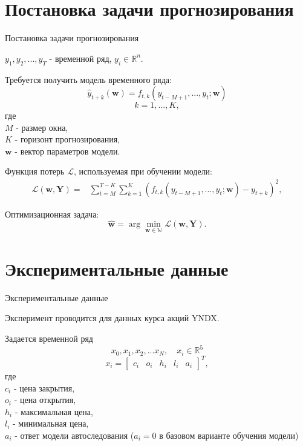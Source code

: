 \documentclass[10pt,pdf,hyperref={unicode}]{beamer}
\begin{document}

\section{Постановка задачи прогнозирования}
\begin{frame}{Постановка задачи прогнозирования}

$y_{1}, y_{2}, ..., y_{T} $ - временной ряд, $y_{i} \in \mathbb{R}^{n}$.

\bigskip

Требуется получить модель временного ряда:
$$\hat{y}_{t+k}(\mathbf{w}) = f_{t,k}(y_{t-M+1}, ..., y_{t}; \mathbf{w})$$
$$k = 1, ..., K,$$
где  \\
$M$ - размер окна, \\
$K$ - горизонт прогнозирования, \\
$\mathbf{w}$ - вектор параметров модели.

Функция потерь $\mathcal{L}$, используемая при обучении модели:
\[
\begin{aligned}
    \mathcal{L}(\mathbf{w, Y}) =& \sum\limits_{t=M}^{T-K}\sum\limits_{k=1}^{K}(f_{t,k}(y_{t-M+1}, ..., y_{t}; \mathbf{w})-y_{t+k})^{2},
\end{aligned}
\]

Оптимизационная задача:
$$\hat{\mathbf{w}} = \arg\min_{\mathbf{w} \in \mathbb{W}} \mathcal{L}(\mathbf{w, Y}).$$

\end{frame}

\section{Экспериментальные данные}
\begin{frame}{Экспериментальные данные}

Эксперимент проводится для данных курса акций YNDX.

Задается временной ряд 
$$x_{0}, x_{1}, x_{2}, ... x_{N}, \quad x_{i} \in \mathbb{R}^{5}$$
$$
    x_{i} = 
    \begin{bmatrix}
        c_{i} & o_{i} & h_{i} & l_{i} & a_{i}
    \end{bmatrix}^{T},
$$
где \\
$c_{i}$ - цена закрытия, \\
$o_{i}$ - цена открытия, \\
$h_{i}$ - максимальная цена, \\
$l_{i}$ - минимальная цена, \\
$a_{i}$ - ответ модели автоследования ($a_{i} = 0$ в базовом варианте обучения модели)

\end{frame}
\end{document}
